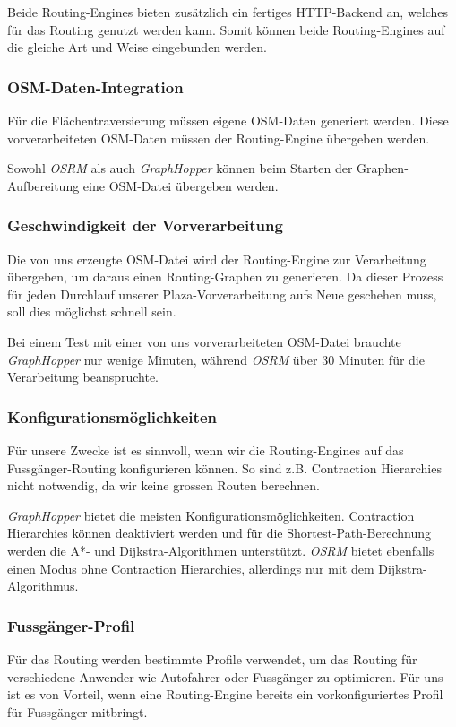 Beide Routing-Engines bieten zusätzlich ein fertiges HTTP-Backend an, welches für das Routing genutzt werden kann. Somit können beide Routing-Engines auf die gleiche Art und Weise eingebunden werden.

\subsubsection{OSM-Daten-Integration}
\label{analyse:OSM-Daten-Integration}
Für die Flächentraversierung müssen eigene \ac{OSM}-Daten generiert werden. Diese vorverarbeiteten \ac{OSM}-Daten müssen der Routing-Engine übergeben werden.

Sowohl \emph{OSRM} als auch \emph{GraphHopper} können beim Starten der Graphen-Aufbereitung eine \ac{OSM}-Datei übergeben werden.

\subsubsection{Geschwindigkeit der Vorverarbeitung}
\label{analyse:Geschwindigkeit der Vorverarbeitung}
Die von uns erzeugte \ac{OSM}-Datei wird der \gls{Routing-Engine} zur Verarbeitung übergeben, um daraus einen Routing-Graphen zu generieren. Da dieser Prozess für jeden Durchlauf unserer Plaza-Vorverarbeitung aufs Neue geschehen muss, soll dies möglichst schnell sein.

Bei einem Test mit einer von uns vorverarbeiteten OSM-Datei brauchte \emph{GraphHopper} nur wenige Minuten, während \emph{OSRM} über 30 Minuten für die Verarbeitung beanspruchte.

\subsubsection{Konfigurationsmöglichkeiten}
\label{analyse:Konfigurationsmöglichkeiten}
Für unsere Zwecke ist es sinnvoll, wenn wir die Routing-Engines auf das Fussgänger-Routing konfigurieren können. So sind z.B. \gls{Contraction Hierarchies} nicht notwendig, da wir keine grossen Routen berechnen.

\emph{GraphHopper} bietet die meisten Konfigurationsmöglichkeiten. \gls{Contraction Hierarchies} können deaktiviert werden und für die \gls{Shortest-Path}-Berechnung werden die A*- und Dijkstra-Algorithmen \cite{astar} \cite{dijkstra_algorithm} unterstützt. \emph{OSRM} bietet ebenfalls einen Modus ohne \gls{Contraction Hierarchies}, allerdings nur mit dem Dijkstra-Algorithmus.

\subsubsection{Fussgänger-Profil}
\label{analyse:Fussgänger-Profil}
Für das Routing werden bestimmte Profile verwendet, um das Routing für verschiedene Anwender wie Autofahrer oder Fussgänger zu optimieren. Für uns ist es von Vorteil, wenn eine \gls{Routing-Engine} bereits ein vorkonfiguriertes Profil für Fussgänger mitbringt.

